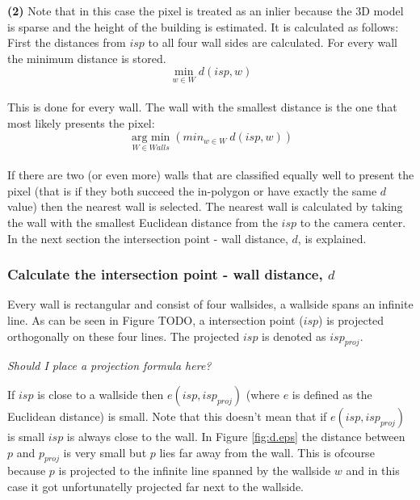 \documentclass[10pt]{article}
\newcommand{\argmin}[1]{\underset{#1}{\operatorname{arg\ min}}}
\begin{document}
\textbf{(2)} Note that in this case the pixel is treated as an inlier because the 3D
model is sparse and the height of the building is estimated. It is 
calculated as follows: \\
First the distances from $isp$ to all four wall sides are calculated.
For every wall the minimum distance is stored.\\
$$\min_{w\in W} d(isp, w)$$\\
This is done for every wall. The wall with the smallest distance is the one that
most likely presents the pixel:\\
$$\argmin{W \in Walls} ( min_{w\in W}\ d(isp, w) )$$\\


If there are two (or even more) walls that are classified equally well to
present the pixel (that is if they both succeed the in-polygon or have exactly the
same $d$ value) then the nearest wall is selected. The nearest wall is
calculated by taking the wall with the smallest Euclidean distance from the $isp$ to the
camera center.
In the next section the intersection point - wall distance, $d$, is explained.

\subsubsection{Calculate the intersection point - wall distance, $d$}
Every wall is rectangular and consist of four wallsides, a wallside spans an
infinite line. As can be seen in Figure TODO, a intersection point ($isp$) is projected orthogonally on these four lines.
The projected $isp$ is denoted as $isp_{proj}$.

\textit{Should I place a projection formula here?}

If $isp$ is close to a wallside then $e(isp, isp_{proj})$ (where $e$ is defined as
the Euclidean distance) is small.  Note that this doesn't mean that if
$e(isp,isp_{proj})$ is small $isp$ is always close to the wall. 
In Figure \ref{fig:d.eps} the distance between $p$ and $p_{proj}$ is very small
but $p$ lies far away from the wall.  This is ofcourse because $p$ is projected
to the infinite line spanned by the wallside $w$ and in this case it got
unfortunatelly projected far next to the wallside.
\end{document}
